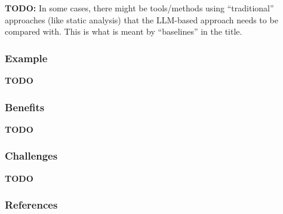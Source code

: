 \documentclass[11pt]{article}
\begin{document}
\textbf{TODO:} In some cases, there might be tools/methods using ``traditional'' approaches (like static analysis) that the LLM-based approach needs to be compared with. This is what is meant by ``baselines'' in the title.

\subsubsection{Example}

\textbf{TODO}

\subsubsection{Benefits}

\textbf{TODO}

\subsubsection{Challenges}

\textbf{TODO}

\subsubsection{References}



\end{document}
